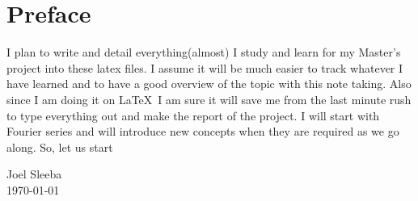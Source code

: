 \chapter{Preface}
I plan to write and detail everything(almost) I study and learn for my Master's project into these latex files. I assume it will be much easier to track whatever I have learned and to have a good overview of the topic with this note taking. Also since I am doing it on \LaTeX\ I am sure it will save me from the last minute rush to type everything out and make the report of the project. I will start with Fourier series and will introduce new concepts when they are required as we go along. So, let us start


Joel Sleeba\\
\today

